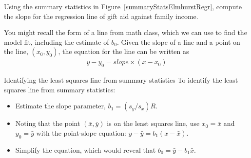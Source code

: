 \begin{exercisewrap}
\begin{nexercise} \label{findingTheSlopeOfTheLSRLineForIncomeAndAid}
Using the summary statistics in Figure~\ref{summaryStatsElmhurstRegr}, compute the slope for the regression line of gift aid against family income.\footnotemark
\end{nexercise}
\end{exercisewrap}

You might recall the  form of a line
from math class, which we can use to find the model fit,
including the estimate of $b_0$.
Given the slope of a line and a point on the line,
$(x_0, y_0)$, the equation for the line can be written as
\begin{align*}
y - y_0 = slope\times (x - x_0)
\end{align*}

\begin{onebox}{Identifying the least squares line from summary statistics}
To identify the least squares line from summary statistics:\vspace{-1mm}
\begin{itemize}
\setlength{\itemsep}{0mm}
\item
    Estimate the slope parameter, $b_1 = (s_y / s_x) R$.
\item
    Noting that the point $(\bar{x}, \bar{y})$ is on the least
    squares line, use $x_0 = \bar{x}$ and $y_0 = \bar{y}$ with
    the point-slope equation: $y - \bar{y} = b_1 (x - \bar{x})$.
\item
    Simplify the equation, which would reveal that
    $b_0 = \bar{y} - b_1 \bar{x}$.
\end{itemize}
\end{onebox}

